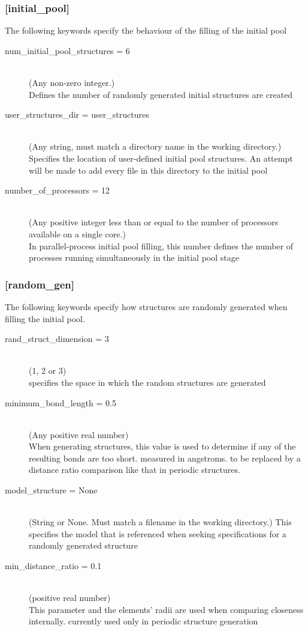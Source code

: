 \subsubsection{[initial\_pool]}
		The following keywords specify the behaviour of the filling of the initial pool
\begin{description}
		\item[num\_initial\_pool\_structures = 6]~\\
			(Any non-zero integer.)\\
			Defines the number of randomly generated initial structures are created
		\item[user\_structures\_dir = user\_structures]~\\
			(Any string, must match a directory name in the working directory.)\\
			Specifies the location of user-defined initial pool structures. An attempt will be made to add every file in this directory to the initial pool
		\item[number\_of\_processors = 12]~\\
			(Any positive integer less than or equal to the number of processors available on a single core.)\\
			In parallel-process initial pool filling, this number defines the number of processes running simultaneously in the initial pool stage
\end{description}

\subsubsection{[random\_gen]}
		The following keywords specify how structures are randomly generated when filling the initial pool.
\begin{description}
		\item[rand\_struct\_dimension = 3]~\\
			(1, 2 or 3)\\
			specifies the space in which the random structures are generated
		\item[minimum\_bond\_length = 0.5]~\\
			(Any positive real number)\\
			When generating structures, this value is used to determine if any of the resulting bonds are too short. measured in angstroms. to be replaced by a distance ratio comparison like that in periodic structures.
		\item[model\_structure = None]~\\
			(String or None. Must match a filename in the working directory.)
			This specifies the model that is referenced when seeking specifications for a randomly generated structure
		\item[min\_distance\_ratio = 0.1]~\\
			(positive real number)\\
			This parameter and the elements' radii are used when comparing closeness internally. currently used only in periodic structure generation
\end{description}

